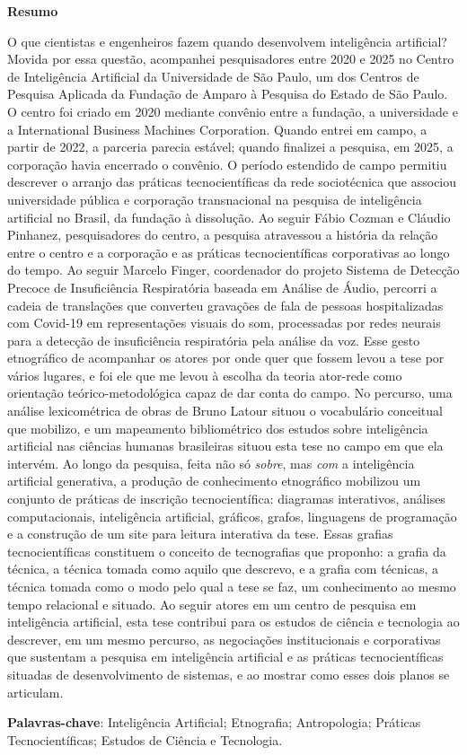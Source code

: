 \begin{center}
  \large{\textbf{Resumo}}
\end{center}
\begingroup
{}
\noindent O que cientistas e engenheiros fazem quando desenvolvem inteligência artificial? Movida por essa questão, acompanhei pesquisadores entre 2020 e 2025 no Centro de Inteligência Artificial da Universidade de São Paulo, um dos Centros de Pesquisa Aplicada da Fundação de Amparo à Pesquisa do Estado de São Paulo. O centro foi criado em 2020 mediante convênio entre a fundação, a universidade e a International Business Machines Corporation. Quando entrei em campo, a partir de 2022, a parceria parecia estável; quando finalizei a pesquisa, em 2025, a corporação havia encerrado o convênio. O período estendido de campo permitiu descrever o arranjo das práticas tecnocientíficas da rede sociotécnica que associou universidade pública e corporação transnacional na pesquisa de inteligência artificial no Brasil, da fundação à dissolução. Ao seguir Fábio Cozman e Cláudio Pinhanez, pesquisadores do centro, a pesquisa atravessou a história da relação entre o centro e a corporação e as práticas tecnocientíficas corporativas ao longo do tempo. Ao seguir Marcelo Finger, coordenador do projeto Sistema de Detecção Precoce de Insuficiência Respiratória baseada em Análise de Áudio, percorri a cadeia de translações que converteu gravações de fala de pessoas hospitalizadas com Covid-19 em representações visuais do som, processadas por redes neurais para a detecção de insuficiência respiratória pela análise da voz. Esse gesto etnográfico de acompanhar os atores por onde quer que fossem levou a tese por vários lugares, e foi ele que me levou à escolha da teoria ator-rede como orientação teórico-metodológica capaz de dar conta do campo. No percurso, uma análise lexicométrica de obras de Bruno Latour situou o vocabulário conceitual que mobilizo, e um mapeamento bibliométrico dos estudos sobre inteligência artificial nas ciências humanas brasileiras situou esta tese no campo em que ela intervém. Ao longo da pesquisa, feita não só \textit{sobre}, mas \textit{com} a inteligência artificial generativa, a produção de conhecimento etnográfico mobilizou um conjunto de práticas de inscrição tecnocientífica: diagramas interativos, análises computacionais, inteligência artificial, gráficos, grafos, linguagens de programação e a construção de um site para leitura interativa da tese. Essas grafias tecnocientíficas constituem o conceito de tecnografias que proponho: a grafia da técnica, a técnica tomada como aquilo que descrevo, e a grafia com técnicas, a técnica tomada como o modo pelo qual a tese se faz, um conhecimento ao mesmo tempo relacional e situado. Ao seguir atores em um centro de pesquisa em inteligência artificial, esta tese contribui para os estudos de ciência e tecnologia ao descrever, em um mesmo percurso, as negociações institucionais e corporativas que sustentam a pesquisa em inteligência artificial e as práticas tecnocientíficas situadas de desenvolvimento de sistemas, e ao mostrar como esses dois planos se articulam.

\noindent \textbf{Palavras-chave}: Inteligência Artificial; Etnografia; Antropologia; Práticas Tecnocientíficas; Estudos de Ciência e Tecnologia.
\endgroup
{}